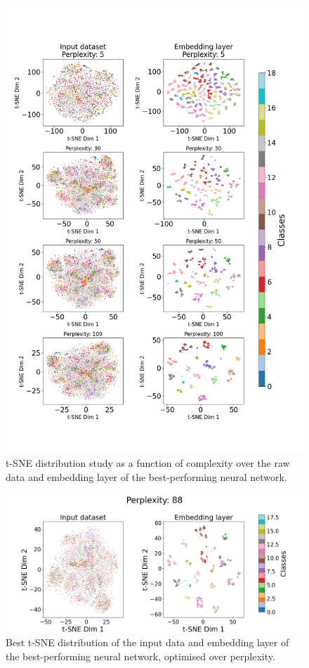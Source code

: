 \documentclass[11pt,a4paper]{article}
\begin{document}
\begin{figure}[htb]
    \centering
    \includegraphics[width=\columnwidth, keepaspectratio]{../tsne.png}
    \caption{t-SNE distribution study as a function of complexity over the raw data and embedding layer of the best-performing neural network.}\label{fig:tsne}
\end{figure}

\begin{figure}[htb]
    \centering
    \includegraphics[width=\columnwidth, keepaspectratio]{../best_tsne.png}
    \caption{Best t-SNE distribution of the input data and embedding layer of the best-performing neural network, optimised over perplexity.}\label{fig:best_tsne}
\end{figure}
\clearpage
\end{document}
